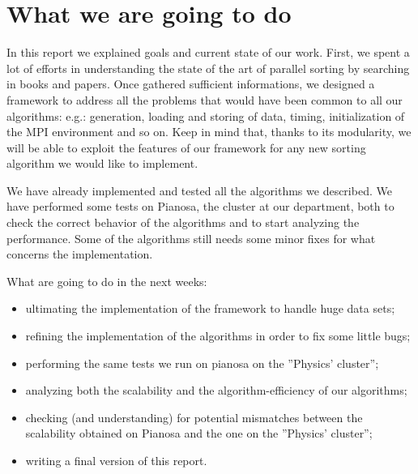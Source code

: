 \section{What we are going to do}
In this report we explained goals and current state of our work. First, we spent a lot of efforts in understanding the state of the art of parallel sorting by searching in books and papers. Once gathered sufficient informations, we designed a framework to address all the problems that would have been common to all our algorithms: e.g.: generation, loading and storing of data, timing, initialization of the MPI environment and so on. Keep in mind that, thanks to its modularity, we will be able to exploit the features of our framework for any new sorting algorithm we would like to implement. 

We have already implemented and tested all the algorithms we described. We have performed some tests on Pianosa, the cluster at our department, both to check the correct behavior of the algorithms and to start analyzing the performance. Some of the algorithms still needs some minor fixes for what concerns the implementation.

What are going to do in the next weeks:
\begin{itemize}
\item ultimating the implementation of the framework to handle huge data sets;
\item refining the implementation of the algorithms in order to fix some little bugs;
\item performing the same tests we run on pianosa on the ''Physics' cluster'';
\item analyzing both the scalability and the algorithm-efficiency of our algorithms;
\item checking (and understanding) for potential mismatches between the scalability obtained on Pianosa and the one on the ''Physics' cluster'';
\item writing a final version of this report.
\end{itemize}